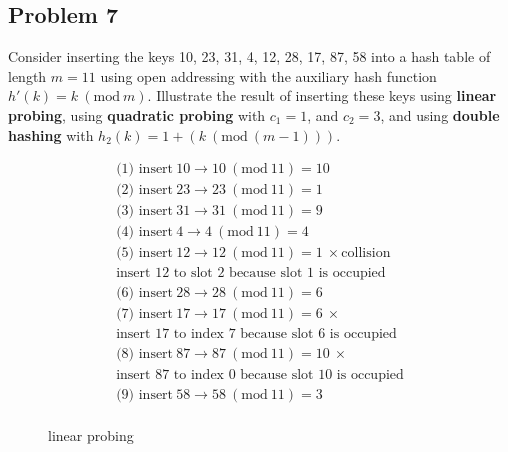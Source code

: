 \documentclass[a4paper]{article}
\newcommand{\Mod}[1]{\ (\mathrm{mod}\ #1)}
\begin{document}
\subsection*{Problem 7}
Consider inserting the keys 10, 23, 31, 4, 12, 28, 17, 87, 58 into a hash table of length $m=11$ using open addressing with the auxiliary hash function $h'(k)=k \Mod{m}$. Illustrate the result of inserting these keys using \textbf{linear probing}, using \textbf{quadratic probing} with $c_1=1$, and $c_2=3$, and using \textbf{double hashing} with $h_2(k)=1+(k \Mod{(m-1)})$. \\
\begin{minipage}{8cm}
\begin{align*}
  &\text{(1) insert}\ 10 \to 10 \Mod{11} = 10\\
  &\text{(2) insert}\ 23 \to 23 \Mod{11} = 1\\
  &\text{(3) insert}\ 31 \to 31 \Mod{11} = 9\\
  &\text{(4) insert}\ 4 \to 4 \Mod{11} = 4\\
  &\text{(5) insert}\ 12 \to  12 \Mod{11} = 1\ \times\text{collision} \\
  &\text{insert $12$ to slot $2$ because slot $1$ is occupied}&\\
  &\text{(6) insert}\ 28\to 28\Mod{11} = 6\\
  &\text{(7) insert}\ 17\to 17\Mod{11} = 6\ \times \\
  &\text{insert $17$ to index $7$ because slot $6$ is occupied}&\\
  &\text{(8) insert}\ 87\to 87\Mod{11} = 10\ \times \\
  &\text{insert $87$ to index $0$ because slot $10$ is occupied}&\\
  &\text{(9) insert}\ 58\to 58\Mod{11} = 3\\
\end{align*}
\end{minipage}
\qquad
\begin{minipage}{5cm}
\begin{figure}[H]
\centering
{}
\caption{linear probing}
\end{figure}
\end{minipage}
\end{document}
